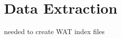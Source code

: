\documentclass[conference]{IEEEtran}
\begin{document}
\section{Data Extraction}

needed to create WAT index files


\end{document}
